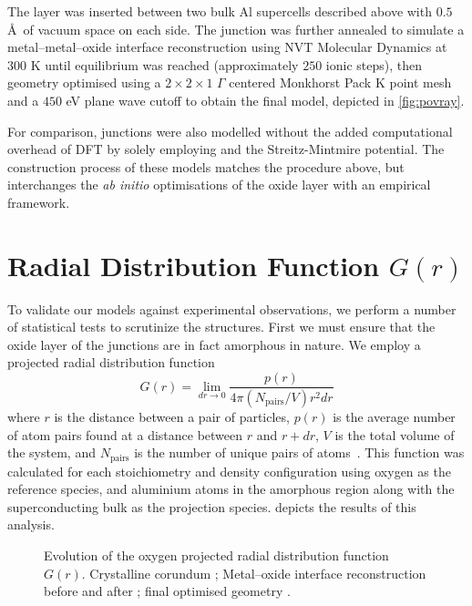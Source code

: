 The  layer was inserted between two bulk Al supercells described above with $0.5$ \AA\ of vacuum space on each side.
The junction was further annealed to simulate a metal--metal--oxide interface reconstruction using  NVT Molecular Dynamics at $300$ K until equilibrium was reached (approximately $250$ ionic steps), then geometry optimised using a $2\!\times\!2\!\times\!1$ $\Gamma$ centered Monkhorst Pack K point mesh and a $450$ eV plane wave cutoff to obtain the final model, depicted in \cref{fig:povray}.

For comparison, junctions were also modelled without the added computational overhead of DFT by solely employing  and the Streitz-Mintmire potential.
The construction process of these models matches the procedure above, but interchanges the \textit{ab initio} optimisations of the oxide layer with an empirical framework.

\section{Radial Distribution Function \texorpdfstring{$G(r)$}{G(r)}}
To validate our models against experimental observations, we perform a number of statistical tests to scrutinize the structures.
First we must ensure that the oxide layer of the junctions are in fact amorphous in nature.
We employ a projected radial distribution function
\begin{equation}
G(r) = \lim_{dr \to 0}\frac{p(r)}{4\pi\left(N_{\mathrm{pairs}}/V\right)r^2dr}
\end{equation}
where $r$ is the distance between a pair of particles, $p(r)$ is the average number of atom pairs found at a distance between $r$ and $r + dr$, $V$ is the total volume of the system, and $N_{\mathrm{pairs}}$ is the number of unique pairs of atoms~\cite{Levine2011}.
This function was calculated for each stoichiometry and density configuration using oxygen as the reference species, and aluminium atoms in the amorphous region along with the superconducting bulk as the projection species.  depicts the results of this analysis.

\begin{figure}[htp]
\resizebox{0.8\textwidth}{!}{}
\caption[Radial Distribution Function]{\label{fig:groptis}Evolution of the oxygen projected radial distribution function $G(r)$. Crystalline corundum ; Metal--oxide interface reconstruction before  and after ; final optimised geometry .}%
\end{figure}

